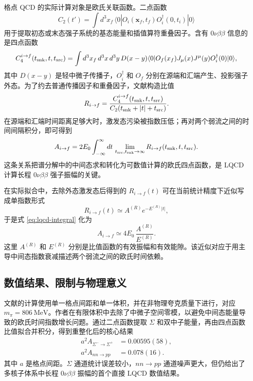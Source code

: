 \documentclass[12pt,a4paper]{ctexart}
\begin{document}
格点 QCD 的实际计算对象是欧氏关联函数。二点函数
\begin{equation}
	C_2(t')
	=
	\int d^3x_f\,
	\langle 0|
	O_i(\mathbf x_f,t_f)
	O_i^\dagger(0,t_i)
	|0\rangle
	\label{eq:lqcd-c2}
\end{equation}
用于提取初态或末态强子系统的基态能量和插值算符重叠因子。含有 $0\nu\beta\beta$ 信息的是四点函数
\begin{equation}
	C_4^{i\to f}
	(t_{\rm snk},t,t_{\rm src})
	=
	\int d^3x_f\,d^3x\,d^3y\,
	D(x-y)
	\langle 0|
	O_f(x_f)
	J_\mu(x)J^\mu(y)
	O_i^\dagger(0)
	|0\rangle ,
	\label{eq:lqcd-c4}
\end{equation}
其中 $D(x-y)$ 是轻中微子传播子，$O_i^\dagger$ 和 $O_f$ 分别在源端和汇端产生、投影强子外态。为了约去普通传播因子和重叠因子，文献\cite{Davoudi2024}构造比值
\begin{equation}
	R_{i\to f}
	=
	\frac{
	C_4^{i\to f}
	(t_{\rm snk},t,t_{\rm src})
	}{
	C_2(t_{\rm snk}+|t|+t_{\rm src})
	}.
	\label{eq:lqcd-ratio}
\end{equation}
在源端和汇端时间距离足够大时，激发态污染被指数压低；再对两个弱流之间的时间间隔积分，即可得到
\begin{equation}
	A_{i\to f}
	=
	2E_0
	\int_{-\infty}^{\infty}dt\,
	\lim_{t_{\rm src},t_{\rm snk}\to\infty}
	R_{i\to f}(t_{\rm snk},t,t_{\rm src}) .
	\label{eq:lqcd-integral}
\end{equation}
这条关系把谱分解中的中间态求和转化为可数值计算的欧氏四点函数，是 LQCD 计算长程 $0\nu\beta\beta$ 强子振幅的关键。

在实际拟合中，去除外态激发态后得到的 $R_{i\to f}(t)$ 可在当前统计精度下近似写成单指数形式
\begin{equation}
	R_{i\to f}(t)\simeq A^{(R)}e^{-E^{(R)}|t|},
	\label{eq:lqcd-single-exp}
\end{equation}
于是式 \eqref{eq:lqcd-integral} 化为
\begin{equation}
	A_{i\to f}
	\simeq
	4E_0\,\frac{A^{(R)}}{E^{(R)}} .
	\label{eq:lqcd-single-exp-integral}
\end{equation}
这里 $A^{(R)}$ 和 $E^{(R)}$ 分别是比值函数的有效振幅和有效能隙。该近似对应于用主导中间态指数衰减描述两个弱流之间的欧氏时间依赖。

\subsection{数值结果、限制与物理意义}

文献\cite{Davoudi2024}的计算使用单一格点间距和单一体积，并在非物理夸克质量下进行，对应 $m_\pi=806~\mathrm{MeV}$。作者在有限体积中去除了中微子空间零模，以避免中间态能量导致的欧氏时间指数增长问题。通过二点函数提取 $\Sigma$ 和双中子能量，再由四点函数比值拟合并积分，得到重整化后的核心结果
\begin{align}
	a^2A_{\Sigma^-\to\Sigma^+} &= 0.00595(58),\\
	a^2A_{nn\to pp} &= 0.078(16).
\end{align}
其中 $a$ 是格点间距。$\Sigma$ 通道统计误差较小，$nn\to pp$ 通道噪声更大，但仍给出了多核子体系中长程 $0\nu\beta\beta$ 振幅的首个直接 LQCD 数值结果。
\end{document}

